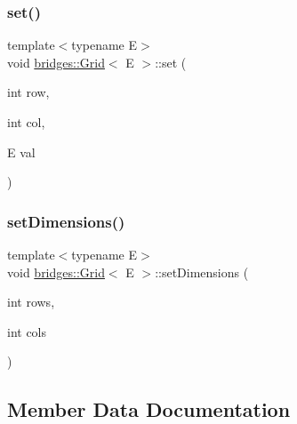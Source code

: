 \mbox{\label{classbridges_1_1_grid_acd750e5886349488257aba85f0b06f6f}} 
\subsubsection{\texorpdfstring{set()}{set()}}
{\footnotesize\ttfamily template$<$typename E$>$ \\
void \mbox{\hyperlink{classbridges_1_1_grid}{bridges\+::\+Grid}}$<$ E $>$\+::set (\begin{DoxyParamCaption}\item[{int}]{row,  }\item[{int}]{col,  }\item[{E}]{val }\end{DoxyParamCaption})\hspace{0.3cm}{\ttfamily [inline]}}

\mbox{\label{classbridges_1_1_grid_a8e5e4d92097f9d1481a14219eb5cc5a8}} 
\subsubsection{\texorpdfstring{set\+Dimensions()}{setDimensions()}}
{\footnotesize\ttfamily template$<$typename E$>$ \\
void \mbox{\hyperlink{classbridges_1_1_grid}{bridges\+::\+Grid}}$<$ E $>$\+::set\+Dimensions (\begin{DoxyParamCaption}\item[{int}]{rows,  }\item[{int}]{cols }\end{DoxyParamCaption})\hspace{0.3cm}{\ttfamily [inline]}}



\subsection{Member Data Documentation}
\mbox{\label{classbridges_1_1_grid_aea6c38498d477f09dc03906ee6fb6e19}} 
